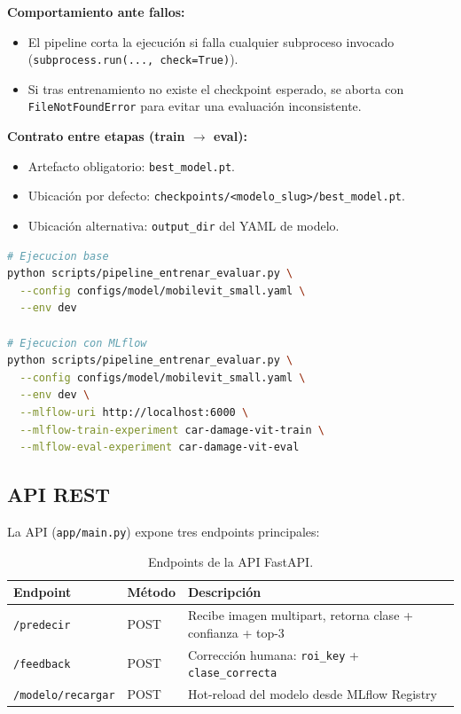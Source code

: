 \documentclass[12pt,a4paper]{article}
\begin{document}
\textbf{Comportamiento ante fallos:}
\begin{itemize}
  \item El pipeline corta la ejecución si falla cualquier subproceso invocado
        (\texttt{subprocess.run(..., check=True)}).
  \item Si tras entrenamiento no existe el checkpoint esperado, se aborta con
        \texttt{FileNotFoundError} para evitar una evaluación inconsistente.
\end{itemize}

\textbf{Contrato entre etapas (train $\rightarrow$ eval):}
\begin{itemize}
  \item Artefacto obligatorio: \texttt{best\_model.pt}.
  \item Ubicación por defecto:
        \texttt{checkpoints/<modelo\_slug>/best\_model.pt}.
  \item Ubicación alternativa: \texttt{output\_dir} del YAML de modelo.
\end{itemize}

\noindent\begin{minipage}{\linewidth}
\begin{lstlisting}[language=bash, caption={Uso del pipeline de entrenamiento/evaluación.}]
# Ejecucion base
python scripts/pipeline_entrenar_evaluar.py \
  --config configs/model/mobilevit_small.yaml \
  --env dev

# Ejecucion con MLflow
python scripts/pipeline_entrenar_evaluar.py \
  --config configs/model/mobilevit_small.yaml \
  --env dev \
  --mlflow-uri http://localhost:6000 \
  --mlflow-train-experiment car-damage-vit-train \
  --mlflow-eval-experiment car-damage-vit-eval
\end{lstlisting}
\end{minipage}

\subsection{API REST}

La API (\texttt{app/main.py}) expone tres endpoints principales:

\begin{table}[H]
  \centering
  \renewcommand{\arraystretch}{1.3}
  \begin{tabular}{p{4.5cm} p{3cm} p{6cm}}
    \toprule
    \textbf{Endpoint} & \textbf{Método} & \textbf{Descripción} \\
    \midrule
    \rowcolor{rowgray}
    \texttt{/predecir}         & POST & Recibe imagen multipart, retorna clase + confianza + top-3 \\
    \texttt{/feedback}         & POST & Corrección humana: \texttt{roi\_key} + \texttt{clase\_correcta} \\
    \rowcolor{rowgray}
    \texttt{/modelo/recargar}  & POST & Hot-reload del modelo desde MLflow Registry \\
    \bottomrule
  \end{tabular}
  \caption{Endpoints de la API FastAPI.}
\end{table}
\end{document}
